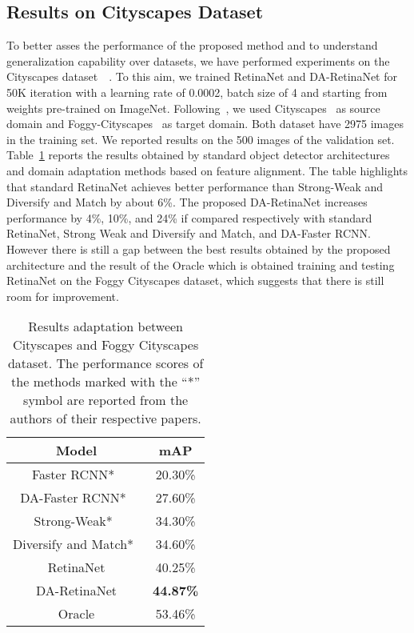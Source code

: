 \documentclass[preprint]{elsarticle}
\begin{document}
\subsection{Results on Cityscapes Dataset}
To better asses the performance of the proposed method and to understand generalization capability over datasets, we have performed experiments on the Cityscapes dataset~\cite{cordts2016cityscapes}~\cite{sakaridis2018semantic}. To this aim, we trained RetinaNet and DA-RetinaNet for 50K iteration with a learning rate of 0.0002, batch size of 4 and starting from weights pre-trained on ImageNet. Following~\cite{Saito_2019}, we used Cityscapes~\cite{cordts2016cityscapes} as source domain and Foggy-Cityscapes~\cite{sakaridis2018semantic} as target domain. Both dataset have 2975 images in the training set. We reported results on the 500 images of the validation set. Table~\ref{tab:cityscape} reports the results obtained by standard object detector architectures and domain adaptation methods based on feature alignment. The table highlights that standard RetinaNet achieves better performance than Strong-Weak and Diversify and Match by about 6\%. The proposed DA-RetinaNet increases performance by 4\%, 10\%, and 24\% if compared respectively with standard RetinaNet, Strong Weak and Diversify and Match, and DA-Faster RCNN. However there is still a gap between the best results obtained by the proposed architecture and the result of the Oracle which is obtained training and testing RetinaNet on the Foggy Cityscapes dataset, which suggests that there is still room for improvement.
\begin{table}[t!]
\caption{Results adaptation between Cityscapes and Foggy Cityscapes dataset. The performance scores of the methods marked with the ``*” symbol are reported from the authors of their respective papers.}
\label{tab:cityscape}
\centering
\begin{tabular}{|c|c|}
\hline
Model & mAP\\
\hline
Faster RCNN*~\cite{Saito_2019}  & 20.30\%\\
\hline
DA-Faster RCNN*~\cite{chen2018domain}  & 27.60\%\\
\hline
Strong-Weak*~\cite{Saito_2019}  & 34.30\%\\
\hline
Diversify and Match*~\cite{kim2019diversify} & 34.60\%\\
\hline
RetinaNet  & 40.25\%\\
\hline
DA-RetinaNet  & \textbf{44.87\%}\\
\hline
Oracle & 53.46\%\\
\hline
\end{tabular}
\end{table}
\end{document}
